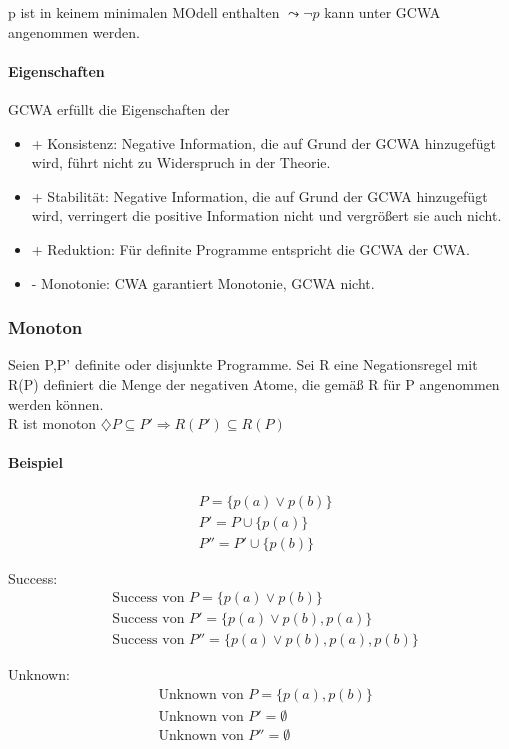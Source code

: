 \documentclass[12pt, a4paper]{article}
\begin{document}
p ist in keinem minimalen MOdell enthalten $\leadsto \lnot p$  kann unter GCWA angenommen werden.

\paragraph{Eigenschaften}
GCWA erfüllt die Eigenschaften der

\begin{itemize}
\item + Konsistenz: Negative Information, die auf Grund der GCWA hinzugefügt wird, führt nicht zu Widerspruch in der Theorie.
\item + Stabilität: Negative Information, die auf Grund der GCWA hinzugefügt wird, verringert die positive Information nicht und vergrößert sie auch nicht.
\item + Reduktion: Für definite Programme entspricht die GCWA der CWA. 
\item - Monotonie: CWA garantiert Monotonie, GCWA nicht.
\end{itemize}

\subsubsection*{Monoton}
Seien P,P' definite oder disjunkte Programme. Sei R eine Negationsregel mit R(P) definiert die Menge der negativen Atome, die gemäß R für P angenommen werden können. \\
R ist monoton $\diamondsuit P \subseteq P' \Rightarrow R(P') \subseteq R(P)$  

\paragraph{Beispiel}

\begin{align*}
&P =  \{ p(a) \vee p(b) \} \\
&P' = P \cup \{ p(a) \} \\
&P'' = P' \cup \{ p(b) \}
\end{align*}

Success:
\begin{align*}
&\text{Success von }P =  \{ p(a) \vee p(b) \} \\
&\text{Success von }P' = \{ p(a) \vee p(b), p(a) \} \\
&\text{Success von }P'' = \{ p(a) \vee p(b), p(a), p(b) \}
\end{align*}

Unknown:
\begin{align*}
&\text{Unknown von }P =  \{ p(a), p(b) \} \\
&\text{Unknown von }P' = \emptyset \\
&\text{Unknown von }P'' = \emptyset
\end{align*}
\end{document}
